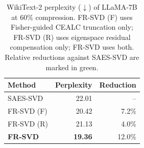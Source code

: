 \begin{table}[t]
\centering
\small
\setlength{\tabcolsep}{7pt}
\renewcommand{\arraystretch}{1.10}
\caption{WikiText-2 perplexity ($\downarrow$) of LLaMA-7B at $60\%$ compression. FR-SVD (F) uses Fisher-guided CEALC truncation only; FR-SVD (R) uses eigenspace residual compensation only; FR-SVD uses both. Relative reductions against SAES-SVD are marked in \textcolor{mygreen}{green}.}
\label{tab:ablation-components}
\begin{tabular}{lrr}
\toprule
Method & Perplexity & Reduction \\
\midrule
SAES-SVD & 22.01 & -- \\
FR-SVD (F) & 20.42 & \textcolor{mygreen}{7.2\%} \\
FR-SVD (R) & 21.13 & \textcolor{mygreen}{4.0\%} \\
\textbf{FR-SVD} & \textbf{19.36} & \textcolor{mygreen}{12.0\%} \\
\bottomrule
\end{tabular}
\end{table}

